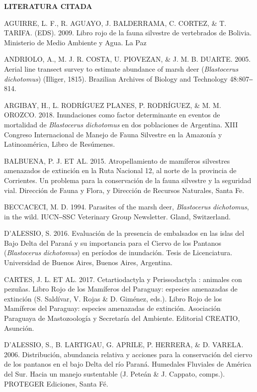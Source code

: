 \documentclass[
  x11names]{article}
\begin{document}
\setlength{\parindent}{20pt}\noindent\textbf{LITERATURA CITADA}

AGUIRRE, L. F., R. AGUAYO, J. BALDERRAMA, C. CORTEZ, \& T. TARIFA.
(EDS). 2009. Libro rojo de la fauna silvestre de vertebrados de Bolivia.
Ministerio de Medio Ambiente y Agua. La Paz

ANDRIOLO, A., M. J. R. COSTA, U. PIOVEZAN, \& J. M. B. DUARTE. 2005.
Aerial line transect survey to estimate abundance of marsh deer
(\textit{Blastocerus} \textit{dichotomus}) (Illiger, 1815). Brazilian
Archives of Biology and Technology 48:807‒814.

ARGIBAY, H., L. RODRÍGUEZ PLANES, P. RODRÍGUEZ, \& M. M. OROZCO. 2018.
Inundaciones como factor determinante en eventos de mortalidad de
\textit{Blastocerus} \textit{dichotomus} en dos poblaciones de
Argentina. XIII Congreso Internacional de Manejo de Fauna Silvestre en
la Amazonía y Latinoamérica, Libro de Resúmenes.

BALBUENA, P. J. ET AL. 2015. Atropellamiento de mamíferos silvestres
amenazados de extinción en la Ruta Nacional 12, al norte de la provincia
de Corrientes. Un problema para la conservación de la fauna silvestre y
la seguridad vial. Dirección de Fauna y Flora, y Dirección de Recursos
Naturales, Santa Fe.

BECCACECI, M. D. 1994. Parasites of the marsh deer, \textit{Blastocerus}
\textit{dichotomus}, in the wild. IUCN‒SSC Veterinary Group Newsletter.
Gland, Switzerland.

D'ALESSIO, S. 2016. Evaluación de la presencia de embalsados en las
islas del Bajo Delta del Paraná y su importancia para el Ciervo de los
Pantanos (\textit{Blastocerus} \textit{dichotomus}) en períodos de
inundación. Tesis de Licenciatura. Universidad de Buenos Aires, Buenos
Aires, Argentina.

CARTES, J. L. ET AL. 2017. Cetartiodactyla y Perissodactyla : animales
con pezuñas. Libro Rojo de los Mamíferos del Paraguay: especies
amenazadas de extinción (S. Saldívar, V. Rojas \& D. Giménez, eds.).
Libro Rojo de los Mamíferos del Paraguay: especies amenazadas de
extinción. Asociación Paraguaya de Mastozoología y Secretaría del
Ambiente. Editorial CREATIO, Asunción.

D'ALESSIO, S., B. LARTIGAU, G. APRILE, P. HERRERA, \& D. VARELA. 2006.
Distribución, abundancia relativa y acciones para la conservación del
ciervo de los pantanos en el bajo Delta del río Paraná. Humedales
Fluviales de América del Sur. Hacia un manejo sustentable (J. Peteán \&
J. Cappato, comps.). PROTEGER Ediciones, Santa Fé.
\end{document}
